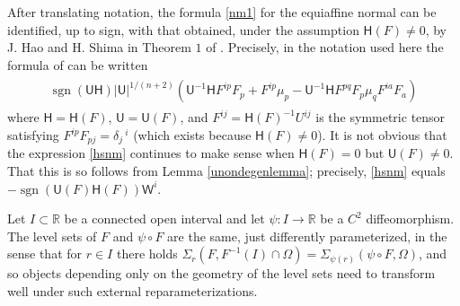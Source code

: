 \documentclass [leqno, 10pt]{amsart}
\theoremstyle{definition}
\numberwithin{equation}{section}
\newcommand{\muf}{\mu}
\newcommand{\U}{\mathsf{U}}
\newcommand{\lc}{\Sigma}
\renewcommand{\H}{\mathsf{H}}
\newcommand{\nm}{\mathsf{W}}
\newcommand{\sign}{\operatorname{sgn}}
\newcommand{\rea}{\mathbb R}
\begin{document}
\begin{remark}
After translating notation, the formula \eqref{nm1} for the equiaffine normal can be identified, up to sign, with that obtained, under the assumption $\H(F) \neq 0$, by J. Hao and H. Shima in Theorem $1$ of \cite{Hao-Shima}. Precisely, in the notation used here the formula of \cite{Hao-Shima} can be written 
\begin{align}\label{hsnm}
\begin{split}
 \sign(\U\H)|\U|^{1/(n+2)}\left(\U^{-1}\H F^{ip}F_{p} + F^{ip}\muf_{p} - \U^{-1}\H F^{pq}F_{p}\muf_{q}F^{ia}F_{a}\right)
\end{split}
\end{align}
where $\H = \H(F)$, $\U = \U(F)$, and $F^{ij} = \H(F)^{-1}U^{ij}$ is the symmetric tensor satisfying $F^{ip}F_{pj} = \delta_{j}\,^{i}$ (which exists because $\H(F) \neq 0$). It is not obvious that the expression \eqref{hsnm} continues to make sense when $\H(F) = 0$ but $\U(F) \neq 0$. That this is so follows from Lemma \ref{unondegenlemma}; precisely, \eqref{hsnm} equals $-\sign(\U(F)\H(F))\nm^{i}$. 
\end{remark}

Let $I\subset \rea$ be a connected open interval and let $\psi:I \to \rea$ be a $C^{2}$ diffeomorphism. The level sets of $F$ and $\psi \circ F$ are the same, just differently parameterized, in the sense that for $r \in I$ there holds $\lc_{r}(F,  F^{-1}(I)\cap \Omega) = \lc_{\psi(r)}(\psi \circ F, \Omega)$, and so objects depending only on the geometry of the level sets need to transform well under such external reparameterizations. 
\end{document}
